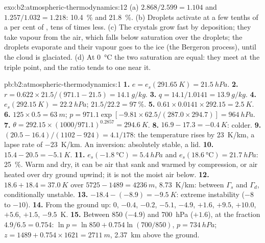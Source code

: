 \begin{solution}{exo:b2:atmospheric-thermodynamics:12}
(a) $2.868/2.599 = 1.104$ and $1.257/1.032 = 1.218$: \qty{10.4}{\percent} and
\qty{21.8}{\percent}. (b) Droplets activate at a few tenths of a per cent of ,
tens of times less. (c) The crystals grow fast by deposition; they take vapour from the air,
which falls below saturation over the droplets; the droplets evaporate and their vapour goes to
the ice (the Bergeron process), until the cloud is glaciated. (d) At \qty{0}{\celsius} the two
saturation  are equal: they meet at the triple point, and the ratio tends to one
near it.
\end{solution}

\begin{solution}{pb:b2:atmospheric-thermodynamics:1}
\textbf{1.} $e = e_s(\qty{291.65}{K}) = \qty{21.5}{hPa}$.
\textbf{2.} $r = 0.622 \times 21.5/(971.1 - 21.5) = \qty{14.1}{g/kg}$.
\textbf{3.} $q = 14.1/1.0141 = \qty{13.9}{g/kg}$.
\textbf{4.} $e_s(\qty{292.15}{K}) = \qty{22.2}{hPa}$; $21.5/22.2 = \qty{97}{\percent}$.
\textbf{5.} $0.61 \times 0.0141 \times 292.15 = \qty{2.5}{K}$.
\textbf{6.} $125 \times 0.5 = \qty{63}{m}$; $p = 971.1 \exp[-9.81 \times 62.5/(287.0 \times 294.7)]
= \qty{964}{hPa}$.
\textbf{7.} $\theta = 292.15 \times (1000/971.1)^{0.2857} = \qty{294.6}{K}$.
\textbf{8.} $16.9 - 17.3 = \qty{-0.4}{K}$: colder.
\textbf{9.} $(20.5 - 16.4)/(1102 - 924) = 4.1/178$: the temperature rises by \qty{23}{K/km}, a
lapse rate of \qty{-23}{K/km}. An inversion: absolutely stable, a lid.
\textbf{10.} $15.4 - 20.5 = \qty{-5.1}{K}$.
\textbf{11.} $e_s(\qty{-1.8}{\celsius}) = \qty{5.4}{hPa}$ and $e_s(\qty{18.6}{\celsius}) =
\qty{21.7}{hPa}$: \qty{25}{\percent}. Warm and dry, it can be air that sank and warmed by
compression, or air heated over dry ground upwind; it is not the moist air below.
\textbf{12.} $18.6 + 18.4 = \qty{37.0}{K}$ over $5725 - 1489 = \qty{4236}{m}$, \qty{8.73}{K/km}: between $\Gamma_s$ and
$\Gamma_d$, conditionally unstable.
\textbf{13.} $-18.4 - (-8.9) = \qty{-9.5}{K}$: extreme instability ($-8$ to $-10$).
\textbf{14.} From the ground up: 0, $-0.4$, $-0.2$, $-5.1$, $-4.9$, $+1.6$, $+9.5$, $+10.0$,
$+5.6$, $+1.5$, $-9.5$~\unit{K}.
\textbf{15.} Between 850 ($-4.9$) and \qty{700}{hPa} ($+1.6$), at the fraction $4.9/6.5 = 0.754$:
$\ln p = \ln 850 + 0.754 \ln(700/850)$, $p = \qty{734}{hPa}$; $z = 1489 + 0.754 \times 1621 =
\qty{2711}{m}$, \qty{2.37}{km} above the ground.

\end{solution}
